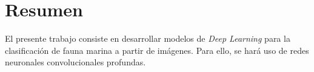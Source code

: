 \section*{Resumen}

\noindent
El presente trabajo consiste en desarrollar modelos de \textit{Deep Learning} para la clasificación de fauna marina
a partir de imágenes. Para ello, se hará uso de redes neuronales convolucionales profundas.